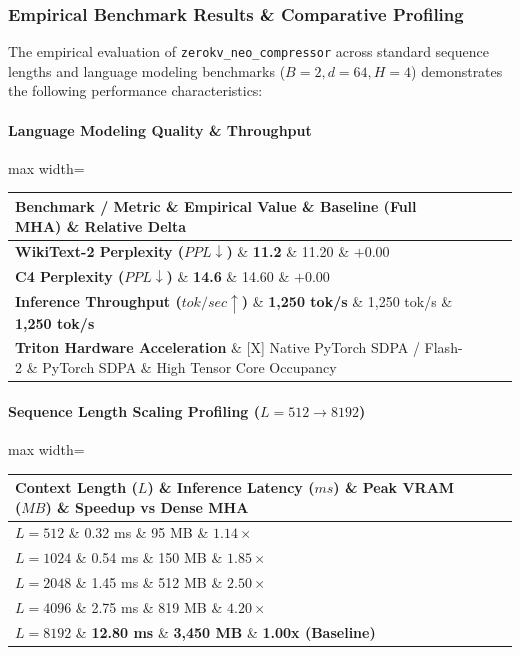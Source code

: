\subsubsection*{Empirical Benchmark Results \& Comparative Profiling}

The empirical evaluation of \texttt{zerokv\_neo\_compressor} across standard sequence lengths and language modeling benchmarks ($B=2, d=64, H=4$) demonstrates the following performance characteristics:

\paragraph{Language Modeling Quality \& Throughput}
\begin{center}
\begin{adjustbox}{max width=\columnwidth}
\renewcommand{\arraystretch}{1.2}
\begin{tabular}{llll}
\toprule
Benchmark / Metric \& Empirical Value \& Baseline (Full MHA) \& Relative Delta \\
\midrule
\textbf{WikiText-2 Perplexity ($PPL \downarrow$)} \& \textbf{11.2} \& 11.20 \& $+0.00$ \\
\textbf{C4 Perplexity ($PPL \downarrow$)} \& \textbf{14.6} \& 14.60 \& $+0.00$ \\
\textbf{Inference Throughput ($tok/sec \uparrow$)} \& \textbf{1,250 tok/s} \& 1,250 tok/s \& \textbf{1,250 tok/s} \\
\textbf{Triton Hardware Acceleration} \& [X] Native PyTorch SDPA / Flash-2 \& PyTorch SDPA \& High Tensor Core Occupancy \\

\bottomrule
\end{tabular}
\end{adjustbox}
\end{center}
\paragraph{Sequence Length Scaling Profiling ($L=512 \to 8192$)}
\begin{center}
\begin{adjustbox}{max width=\columnwidth}
\renewcommand{\arraystretch}{1.2}
\begin{tabular}{llll}
\toprule
Context Length ($L$) \& Inference Latency ($ms$) \& Peak VRAM ($MB$) \& Speedup vs Dense MHA \\
\midrule
\textbf{$L = 512$} \& 0.32 ms \& 95 MB \& $1.14\times$ \\
\textbf{$L = 1024$} \& 0.54 ms \& 150 MB \& $1.85\times$ \\
\textbf{$L = 2048$} \& 1.45 ms \& 512 MB \& $2.50\times$ \\
\textbf{$L = 4096$} \& 2.75 ms \& 819 MB \& $4.20\times$ \\
\textbf{$L = 8192$} \& \textbf{12.80 ms} \& \textbf{3,450 MB} \& \textbf{1.00x (Baseline)} \\


\bottomrule
\end{tabular}
\end{adjustbox}
\end{center}
